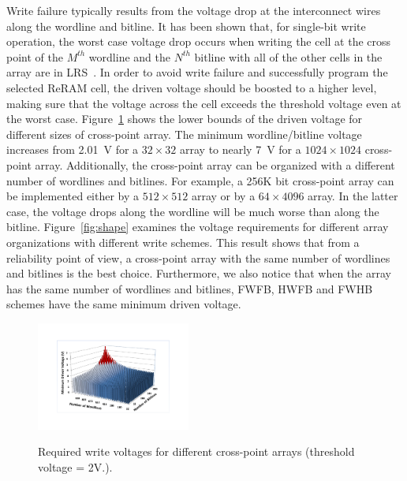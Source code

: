 Write failure typically results from the voltage drop at the interconnect
wires along the wordline and bitline. It has been shown that, for
single-bit write operation, the worst case voltage drop occurs when
writing the cell at the cross point of the $M^{th}$ wordline and the
$N^{th}$ bitline with all of the other cells in the array are in
LRS~\cite{crossbar_TED_2010}. In order to avoid write failure and
successfully program the selected ReRAM cell, the driven voltage should be
boosted to a higher level, making sure that the voltage across the cell
exceeds the threshold voltage even at the worst case.
Figure~\ref{fig:worst_v} shows the lower bounds of the driven voltage for
different sizes of cross-point array. The minimum wordline/bitline voltage
increases from 2.01~V for a $32 \times 32$ array to nearly 7~V for a $1024
\times 1024$ cross-point array. Additionally, the cross-point array can be
organized with a different number of wordlines and bitlines. For example,
a 256K bit cross-point array can be implemented either by a $512 \times
512$ array or by a $64 \times 4096$ array. In the latter case, the voltage
drops along the wordline will be much worse than along the bitline.
Figure~\ref{fig:shape} examines the voltage requirements for different
array organizations with different write schemes. This result shows that
from a reliability point of view, a cross-point array with the same number
of wordlines and bitlines is the best choice. Furthermore, we also notice
that when the array has the same number of wordlines and bitlines, FWFB,
HWFB and FWHB schemes have the same minimum driven voltage.


\begin{figure}%
\centering
\hspace{-5pt}
  \includegraphics[width=0.45\textwidth]{./figures/worst_v_f1.pdf}\\
  \caption{Required write voltages for different cross-point arrays (threshold voltage = 2V.). }\label{fig:worst_v}
  \vspace{-5pt}
\end{figure}


